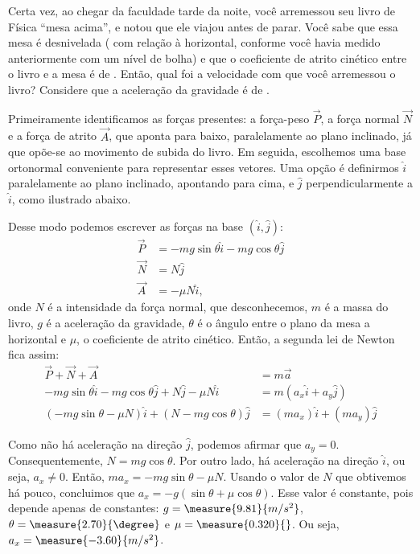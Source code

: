\begin{question}
	Certa vez, ao chegar da faculdade tarde da noite, você arremessou seu livro de Física ``mesa acima'', e notou que ele viajou  antes de parar.
	Você sabe que essa mesa é desnivelada ( com relação à horizontal, conforme você havia medido anteriormente com um nível de bolha) e que o coeficiente de atrito cinético entre o livro e a mesa é de .
	Então, qual foi a velocidade com que você arremessou o livro?
	Considere que a aceleração da gravidade é de .

	\begin{answer}
	\end{answer}

	\begin{solution}
		Primeiramente identificamos as forças presentes: a força-peso $\vec P$, a força normal $\vec N$ e a força de atrito $\vec A$, que aponta para baixo, paralelamente ao plano inclinado, já que opõe-se ao movimento de subida do livro.
		Em seguida, escolhemos uma base ortonormal conveniente para representar esses vetores.
		Uma opção é definirmos $\hat i$ paralelamente ao plano inclinado, apontando para cima, e $\hat j$ perpendicularmente a $\hat i$, como ilustrado abaixo.


		Desse modo podemos escrever as forças na base $(\hat i, \hat j)$:
		\begin{align*}
			\vec P &= -mg\sin\theta\hat i - mg\cos\theta\hat j \\
			\vec N &= N\hat j \\
			\vec A &= -\mu N \hat i,
		\end{align*}
		onde $N$ é a intensidade da força normal, que desconhecemos, $m$ é a massa do livro, $g$ é a aceleração da gravidade, $\theta$ é o ângulo entre o plano da mesa a horizontal e $\mu$, o coeficiente de atrito cinético.
		Então, a segunda lei de Newton fica assim:
		\begin{align*}
			\vec P + \vec N + \vec A &= m \vec a \\
			-mg\sin\theta\hat i - mg\cos\theta\hat j + N\hat j -\mu N \hat i &= m (a_x \hat i + a_y \hat j) \\
			(-mg\sin\theta - \mu N) \hat i + (N  - mg\cos\theta)\hat j &= (m a_x)\hat i + (m a_y) \hat j
		\end{align*}

		Como não há aceleração na direção $\hat j$, podemos afirmar que $a_y = 0$.
		Consequentemente, $N = mg\cos\theta$.
		Por outro lado, há aceleração na direção $\hat i$, ou seja, $a_x \ne 0$.
		Então, $ma_x = -mg\sin\theta - \mu N$.
		Usando o valor de $N$ que obtivemos há pouco, concluimos que $a_x = -g(\sin\theta + \mu \cos\theta)$.
		Esse valor é constante, pois depende apenas de constantes: $g = \measure{9.81}{m/s^2}$, $\theta = \measure{2.70}{\degree}$ e $\mu = \measure{0.320}{}$.
		Ou seja, $a_x = \measure{-3.60}{m/s^2}$.


\end{solution}
\end{question}
